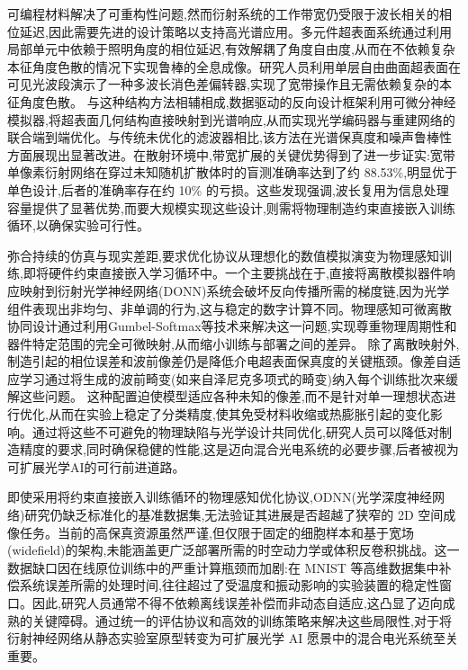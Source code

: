 \documentclass[11pt]{article}
\begin{document}
可编程材料解决了可重构性问题,然而衍射系统的工作带宽仍受限于波长相关的相位延迟,因此需要先进的设计策略以支持高光谱应用。多元件超表面系统通过利用局部单元中依赖于照明角度的相位延迟,有效解耦了角度自由度,从而在不依赖复杂本征角度色散的情况下实现鲁棒的全息成像。研究人员利用单层自由曲面超表面在可见光波段演示了一种多波长消色差偏转器,实现了宽带操作且无需依赖复杂的本征角度色散。\citep{doi_10_1021_acs_nanolett_4c02995_4955c826} 与这种结构方法相辅相成,数据驱动的反向设计框架利用可微分神经模拟器,将超表面几何结构直接映射到光谱响应,从而实现光学编码器与重建网络的联合端到端优化。与传统未优化的滤波器相比,该方法在光谱保真度和噪声鲁棒性方面展现出显著改进。在散射环境中,带宽扩展的关键优势得到了进一步证实:宽带单像素衍射网络在穿过未知随机扩散体时的盲测准确率达到了约 88.53\%,明显优于单色设计,后者的准确率存在约 10\% 的亏损。这些发现强调,波长复用为信息处理容量提供了显著优势,而要大规模实现这些设计,则需将物理制造约束直接嵌入训练循环,以确保实验可行性。\citep{doi_10_2528_pier25052305_11655dbe} \citep{s2_76a83ea3baed75ad88b7f0782eb9a694a330c853_cee16cac} \citep{doi_10_1038_s41377_023_01116_3_aba67a18}

弥合持续的仿真与现实差距,要求优化协议从理想化的数值模拟演变为物理感知训练,即将硬件约束直接嵌入学习循环中。一个主要挑战在于,直接将离散模拟器件响应映射到衍射光学神经网络(DONN)系统会破坏反向传播所需的梯度链,因为光学组件表现出非均匀、非单调的行为,这与稳定的数字计算不同。物理感知可微离散协同设计通过利用Gumbel-Softmax等技术来解决这一问题,实现尊重物理周期性和器件特定范围的完全可微映射,从而缩小训练与部署之间的差异。\citep{doi_10_1145_3508352_3549378_13c53996} 除了离散映射外,制造引起的相位误差和波前像差仍是降低介电超表面保真度的关键瓶颈。像差自适应学习通过将生成的波前畸变(如来自泽尼克多项式的畸变)纳入每个训练批次来缓解这些问题。\citep{s2_8560e3428b029604da9bd494e485939165b3777e_bf7326ee} 这种配置迫使模型适应各种未知的像差,而不是针对单一理想状态进行优化,从而在实验上稳定了分类精度,使其免受材料收缩或热膨胀引起的变化影响。通过将这些不可避免的物理缺陷与光学设计共同优化,研究人员可以降低对制造精度的要求,同时确保稳健的性能,这是迈向混合光电系统的必要步骤,后者被视为可扩展光学AI的可行前进道路。\citep{doi_10_1145_3508352_3549378_13c53996} \citep{s2_8560e3428b029604da9bd494e485939165b3777e_bf7326ee} \citep{doi_10_1063_5_0141881_93942631}

即使采用将约束直接嵌入训练循环的物理感知优化协议,ODNN(光学深度神经网络)研究仍缺乏标准化的基准数据集,无法验证其进展是否超越了狭窄的 2D 空间成像任务。当前的高保真资源虽然严谨,但仅限于固定的细胞样本和基于宽场(widefield)的架构,未能涵盖更广泛部署所需的时空动力学或体积反卷积挑战。这一数据缺口因在线原位训练中的严重计算瓶颈而加剧:在 MNIST 等高维数据集中补偿系统误差所需的处理时间,往往超过了受温度和振动影响的实验装置的稳定性窗口。因此,研究人员通常不得不依赖离线误差补偿而非动态自适应,这凸显了迈向成熟的关键障碍。通过统一的评估协议和高效的训练策略来解决这些局限性,对于将衍射神经网络从静态实验室原型转变为可扩展光学 AI 愿景中的混合电光系统至关重要。\citep{doi_10_1038_s41597_026_07467_x_ae097478} \citep{s2_dac795899d5e98d409739c3bcfe096491d6b7427_5b5c8d05}
\end{document}
